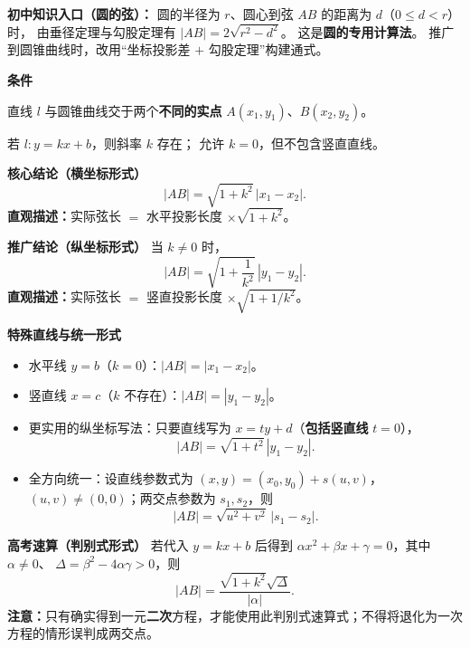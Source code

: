 \begin{statementbox}


\textbf{初中知识入口（圆的弦）：}
圆的半径为 $r$、圆心到弦 $AB$ 的距离为 $d$（$0\le d<r$）时，
由垂径定理与勾股定理有
$\displaystyle |AB|=2\sqrt{r^2-d^2}$。
这是\textbf{圆的专用计算法}。
推广到圆锥曲线时，改用“坐标投影差 $+$ 勾股定理”构建通式。

\medskip
\textbf{\textcolor{CStatement}{条件}}
\begin{description}[style=nextline,leftmargin=2.8em,labelsep=0.5em,itemsep=0.4em]
  \item[\textbf{条件一（两交点）}] 直线 $l$ 与圆锥曲线交于两个\textbf{不同的实点}
  $A(x_1,y_1)$、$B(x_2,y_2)$。
  \item[\textbf{条件二（斜率）}] 若 $l:y=kx+b$，则斜率 $k$ 存在；
  允许 $k=0$，但不包含竖直直线。
\end{description}

\textbf{\textcolor{CStatement}{核心结论（横坐标形式）}}
\[
  \boxed{|AB|=\sqrt{1+k^2}\,|x_1-x_2|.}
\]
\textbf{直观描述：}实际弦长 $=$ 水平投影长度 $\times\sqrt{1+k^2}$。

\medskip
\textbf{\textcolor{CStatement}{推广结论（纵坐标形式）}}
当 $k\neq0$ 时，
\[
  \boxed{|AB|=\sqrt{1+\frac{1}{k^2}}\,|y_1-y_2|.}
\]
\textbf{直观描述：}实际弦长 $=$ 竖直投影长度 $\times\sqrt{1+1/k^2}$。

\medskip
\textbf{\textcolor{CStatement}{特殊直线与统一形式}}
\begin{itemize}[leftmargin=*,itemsep=0.3em]
 \item 水平线 $y=b$（$k=0$）：$\boxed{|AB|=|x_1-x_2|}$。
 \item 竖直线 $x=c$（$k$ 不存在）：$\boxed{|AB|=|y_1-y_2|}$。
 \item 更实用的纵坐标写法：只要直线写为 $x=ty+d$（\textbf{包括竖直线} $t=0$），
 \[
  \boxed{|AB|=\sqrt{1+t^2}\,|y_1-y_2|.}
 \]
 \item 全方向统一：设直线参数式为 $(x,y)=(x_0,y_0)+s(u,v)$，$(u,v)\ne(0,0)$；两交点参数为 $s_1,s_2$，则
 \[
  \boxed{|AB|=\sqrt{u^2+v^2}\,|s_1-s_2|.}
 \]
\end{itemize}

\textbf{\textcolor{CStatement}{高考速算（判别式形式）}}
若代入 $y=kx+b$ 后得到
$\alpha x^2+\beta x+\gamma=0$，其中 $\alpha\ne0$、
$\Delta=\beta^2-4\alpha\gamma>0$，则
\[
 \boxed{|AB|=\frac{\sqrt{1+k^2}\sqrt{\Delta}}{|\alpha|}.}
\]
\textbf{注意：}只有确实得到一元\textbf{二次}方程，才能使用此判别式速算式；不得将退化为一次方程的情形误判成两交点。
\end{statementbox}
